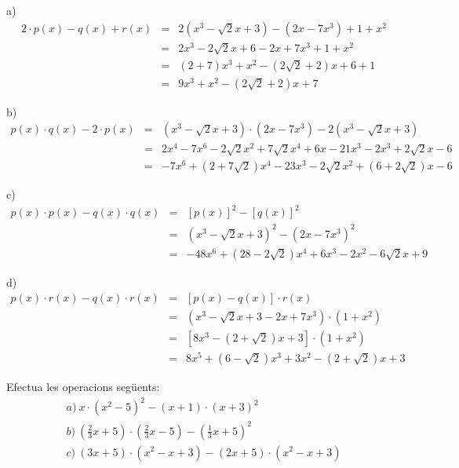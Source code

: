 \begin{solucio}
a)\begin{eqnarray*}
2\cdot p(x)-q(x)+r(x) &=&2\left( x^{3}-\sqrt{2}x+3\right) -\left(
2x-7x^{3}\right) +1+x^{2} \\
&=&2x^{3}-2\sqrt{2}x+6-2x+7x^{3}+1+x^{2} \\
&=&(2+7)x^{3}+x^{2}-(2\sqrt{2}+2)x+6+1 \\
&=&9x^{3}+x^{2}-(2\sqrt{2}+2)x+7
\end{eqnarray*}

b)\begin{eqnarray*}
p(x)\cdot q(x)-2\cdot p(x) &=&\left( x^{3}-\sqrt{2}x+3\right) \cdot \left(
2x-7x^{3}\right) -2\left( x^{3}-\sqrt{2}x+3\right) \\
&=&2x^{4}-7x^{6}-2\sqrt{2}x^{2}+7\sqrt{2}x^{4}+6x-21x^{3}-2x^{3}+2\sqrt{2}x-6
\\
&=&-7x^{6}+(2+7\sqrt{2})x^{4}-23x^{3}-2\sqrt{2}x^{2}+(6+2\sqrt{2})x-6
\end{eqnarray*}

c)\begin{eqnarray*}
p(x)\cdot p(x)-q(x)\cdot q(x) &=&\left[ p(x)\right] ^{2}-\left[ q(x)\right]
^{2} \\
&=&\left( x^{3}-\sqrt{2}x+3\right) ^{2}-\left( 2x-7x^{3}\right) ^{2} \\
&=&-48x^{6}+(28-2\sqrt{2})x^{4}+6x^{3}-2x^{2}-6\sqrt{2}x+9
\end{eqnarray*}

d)
\begin{eqnarray*}
p(x)\cdot r(x)-q(x)\cdot r(x) &=&\left[ p(x)-q(x)\right] \cdot r(x) \\
&=&\left( x^{3}-\sqrt{2}x+3-2x+7x^{3}\right) \cdot \left( 1+x^{2}\right) \\
&=&\left[ 8x^{3}-\left( 2+\sqrt{2}\right) x+3\right] \cdot \left(
1+x^{2}\right) \\
&=&8x^{5}+\left( 6-\sqrt{2}\right) x^{3}+3x^{2}-\left( 2+\sqrt{2}\right) x+3
\end{eqnarray*}
\end{solucio}

\begin{exercici}
Efectua les operacions següents:\[
\begin{array}{l}
a)~x\cdot (x^{2}-5)^{2}-(x+1)\cdot (x+3)^{2} \\
b)~\left( \frac{2}{3}x+5\right) \cdot \left( \frac{2}{3}x-5\right) -\left(
\frac{1}{3}x+5\right) ^{2} \\
c)~(3x+5)\cdot (x^{2}-x+3)-(2x+5)\cdot (x^{2}-x+3)\end{array}\]
\end{exercici}

